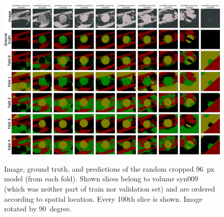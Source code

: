\clearpage
\begin{figure}[!htb]
    \centering
    \includegraphics[clip,trim={0 0 0 7}, height=\textwidth, angle=90]{pictures/experiment_2/random_cropped_res96_final_example_predictions_2_all_folds}\\
    \caption[Predictions with Random Cropped 96~px Regime]{Image, ground truth, and predictions of the random cropped 96~px model (from each fold). Shown slices belong to volume syn009 (which was neither part of train nor validation set) and are ordered according to spatial location. Every 100th slice is shown. Image rotated by 90~degree.}
    \label{fig:random_cropped_96-predictions-syn009-by-fold}
\end{figure}

